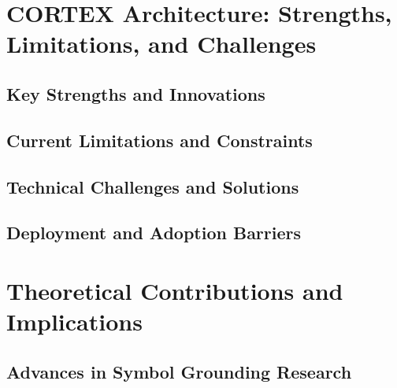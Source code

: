 \section{CORTEX Architecture: Strengths, Limitations, and Challenges}

\subsection{Key Strengths and Innovations}

\subsection{Current Limitations and Constraints}

\subsection{Technical Challenges and Solutions}

\subsection{Deployment and Adoption Barriers}

\section{Theoretical Contributions and Implications}

\subsection{Advances in Symbol Grounding Research}

